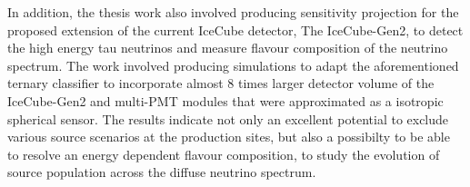 In addition, the thesis work also involved producing sensitivity projection for the proposed extension of the current IceCube detector, The IceCube-Gen2, to detect the high energy tau neutrinos and measure flavour composition of the neutrino spectrum. The work involved producing simulations to adapt the aforementioned ternary classifier to incorporate almost 8 times larger detector volume of the IceCube-Gen2 and multi-PMT modules that were approximated as a isotropic spherical sensor. The results indicate not only an excellent potential to exclude various source scenarios at the production sites, but also a possibilty to be able to resolve an energy dependent flavour composition, to study the evolution of source population across the diffuse neutrino spectrum.
